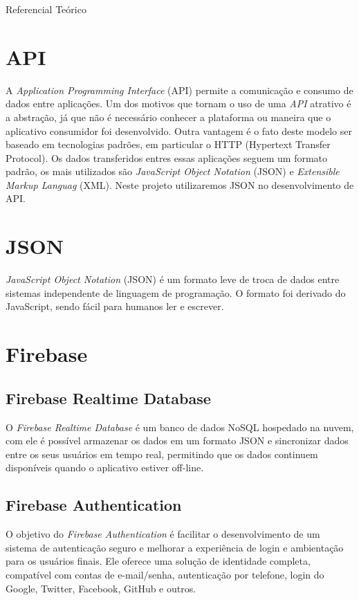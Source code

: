 \documentclass[
	12pt,				%
	openright,			%
	twoside,			%
	a4paper,			%
	english,			%
	french,				%
	spanish,			%
	brazil				%
	]{abntex2}
\begin{document}
\begin{chapter}{Referencial Teórico}
\section{API}
A \textit{Application Programming Interface} (API) permite a comunicação e consumo de dados entre aplicações. Um dos motivos que tornam o uso de uma \textit{API} atrativo é a abstração, já que não é necessário conhecer a plataforma ou maneira que o aplicativo consumidor foi desenvolvido. Outra vantagem é o fato deste modelo ser baseado em tecnologias padrões, em particular o HTTP (Hypertext Transfer Protocol). Os dados transferidos entres essas aplicações seguem um formato padrão, os mais utilizados são \textit{JavaScript Object Notation} (JSON) e \textit{Extensible Markup Languag} (XML). Neste projeto utilizaremos JSON no desenvolvimento de API.

\section{JSON}
\textit{JavaScript Object Notation} (JSON) é um formato leve de troca de dados entre sistemas independente de linguagem de programação. O formato foi derivado do JavaScript, sendo fácil para humanos ler e escrever.

\section{Firebase}
\subsection{Firebase Realtime Database}
O \textit{Firebase Realtime Database} é um banco de dados NoSQL hospedado na nuvem, com ele é possível armazenar os dados em um formato JSON e sincronizar dados entre os seus usuários em tempo real, permitindo que os dados continuem disponíveis quando o aplicativo estiver off-line.

\subsection{Firebase Authentication}
O objetivo do \textit{Firebase Authentication} é facilitar o desenvolvimento de um sistema de autenticação seguro e melhorar a experiência de login e ambientação para os usuários finais. Ele oferece uma solução de identidade completa, compatível com contas de e-mail/senha, autenticação por telefone, login do Google, Twitter, Facebook, GitHub e outros.

\end{chapter}
\end{document}
